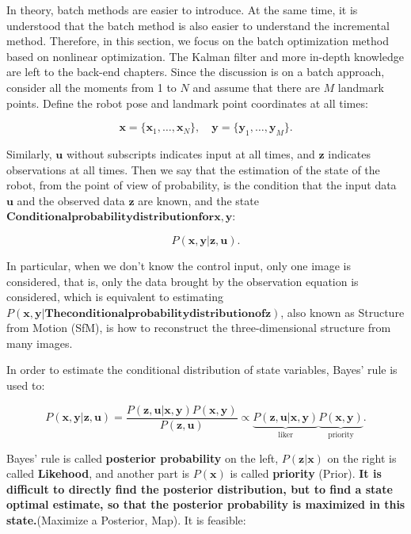 In theory, batch methods are easier to introduce. At the same time, it is understood that the batch method is also easier to understand the incremental method. Therefore, in this section, we focus on the batch optimization method based on nonlinear optimization. The Kalman filter and more in-depth knowledge are left to the back-end chapters. Since the discussion is on a batch approach, consider all the moments from 1 to $N$ and assume that there are $M$ landmark points. Define the robot pose and landmark point coordinates at all times:

\[
\bm{x}=\{ \bm{x}_1, \ldots, \bm{x}_N \}, \quad \bm{y} = \{\bm{y}_1, \ldots, \bm{ y}_M \}.
\]

Similarly, $\bm{u}$ without subscripts indicates input at all times, and $\bm{z}$ indicates observations at all times. Then we say that the estimation of the state of the robot, from the point of view of probability, is the condition that the input data $\bm{u}$ and the observed data $\bm{z}$ are known, and the state $\bm{ Conditional probability distribution for x}, \bm{y}$:

\begin{equation}
P( \bm{x},\bm{y} | \bm{z}, \bm{u}).
\end{equation}

In particular, when we don't know the control input, only one image is considered, that is, only the data brought by the observation equation is considered, which is equivalent to estimating $P( \bm{x},\bm{y} | \bm{ The conditional probability distribution of z})$, also known as Structure from Motion (SfM), is how to reconstruct the three-dimensional structure \textsuperscript{\cite{Agarwal2009}} from many images.

In order to estimate the conditional distribution of state variables, Bayes' rule is used to:

\begin{equation}
P\left( { \bm{x},\bm{y}| \bm{z}, \bm{u}} \right) = \frac{{P\left( {\bm{z},\bm {u}|\bm{x},\bm{y}} \right)P\left( \bm{x}, \bm{y} \right)}}{{P\left( \bm{z} ,\bm{u}\right)}} \propto \underbrace{P\left( { \bm{z},\bm{u}| \bm{x},\bm{y} } \right)}_ {\text{liker}} \underbrace{P\left( \bm{x},\bm{y} \right)}_{\text{priority}}.
\end{equation}

Bayes' rule is called \textbf{posterior probability} on the left, $P(\bm{z}|\bm{x})$ on the right is called \textbf{Likehood}, and another part is $ P(\bm{x})$ is called \textbf{priority} (Prior). \textbf{It is difficult to directly find the posterior distribution, but to find a state optimal estimate, so that the posterior probability is maximized in this state.}(Maximize a Posterior, Map). It is feasible:

